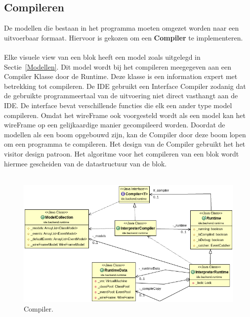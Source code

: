 \documentclass[]{article}
\begin{document}
\subsection{Compileren}
\label{Compileer}
De modellen die bestaan in het programma moeten omgezet worden naar een uitvoerbaar formaat. Hiervoor is gekozen om een \textbf{Compiler} te implementeren.  \\\\
Elke visuele view van een blok heeft een model zoals uitgelegd in Sectie~\ref{Modellen}. Dit model wordt bij het compileren meegegeven aan een Compiler Klasse door de Runtime. Deze klasse is een information expert met betrekking tot compileren. De IDE gebruikt een Interface Compiler zodanig dat de gebruikte programmeertaal van de uitvoering niet direct vasthangt aan de IDE. De interface bevat verschillende functies die elk een ander type model compileren. Omdat het wireFrame ook voorgesteld wordt als een model kan het wireFrame op een gelijkaardige manier gecompileerd worden. Doordat de modellen als een boom opgebouwd zijn, kan de Compiler door deze boom lopen om een programma te compileren. Het design van de Compiler gebruikt het het visitor design patroon. Het algoritme voor het compileren van een blok wordt hiermee gescheiden van de datastructuur van de blok.\\\\
\begin{figure}[H]
  \centering
\includegraphics[scale=0.4]{AnalyseADTAlgorithm/compiler-runtime-modelCollection}
  \caption{Compiler.} 
\end{figure}
\end{document}
